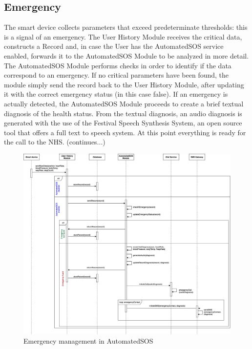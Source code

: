 \subsection{Emergency}

The smart device collects parameters that exceed predeterminate thresholds: this is a signal of an emergency.
The User History Module receives the critical data, constructs a Record and, in case the User has the AutomatedSOS service enabled, forwards it to the AutomatedSOS Module to be analyzed in more detail.
The AutomatedSOS Module performs checks in order to identify if the data correspond to an emergency. If no critical parameters have been found, the module simply send the record back to the User History Module, after updating it with the correct emergency status (in this case false). If an emergency is actually detected, the AutomatedSOS Module proceeds to create a brief textual diagnosis of the health status. From the textual diagnosis, an audio diagnosis is generated with the use of the Festival Speech Synthesis System, an open source tool that offers a full text to speech system. At this point everything is ready for the call to the NHS. (continues...)

\begin{figure}[H]

    \centering
    \includegraphics[scale=0.16]{./Pictures/sequence-emergency.png}
    \caption{Emergency management in AutomatedSOS}
    
\end{figure}

